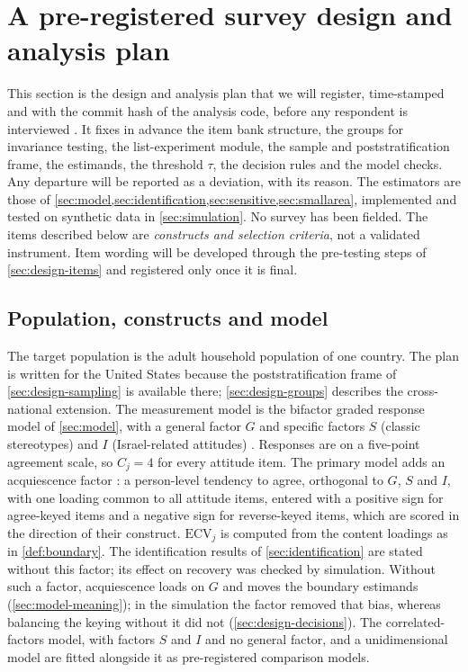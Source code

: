 \section{A pre-registered survey design and analysis plan}\label{sec:design}

This section is the design and analysis plan that we will register, time-stamped and with the commit hash of the analysis code, before any respondent is interviewed \citep{nosek2018}. It fixes in advance the item bank structure, the groups for invariance testing, the list-experiment module, the sample and poststratification frame, the estimands, the threshold $\tau$, the decision rules and the model checks. Any departure will be reported as a deviation, with its reason. The estimators are those of \cref{sec:model,sec:identification,sec:sensitive,sec:smallarea}, implemented and tested on synthetic data in \cref{sec:simulation}. No survey has been fielded. The items described below are \emph{constructs and selection criteria}, not a validated instrument. Item wording will be developed through the pre-testing steps of \cref{sec:design-items} and registered only once it is final.

\subsection{Population, constructs and model}\label{sec:design-constructs}

The target population is the adult household population of one country. The plan is written for the United States because the poststratification frame of \cref{sec:design-sampling} is available there; \cref{sec:design-groups} describes the cross-national extension. The measurement model is the bifactor graded response model of \cref{sec:model}, with a general factor $G$ and specific factors $S$ (classic stereotypes) and $I$ (Israel-related attitudes) \citep{samejima1969,gibbons1992,reise2012}. Responses are on a five-point agreement scale, so $C_j=4$ for every attitude item. The primary model adds an acquiescence factor \citep{maydeuolivares2006}: a person-level tendency to agree, orthogonal to $G$, $S$ and $I$, with one loading common to all attitude items, entered with a positive sign for agree-keyed items and a negative sign for reverse-keyed items, which are scored in the direction of their construct. $\mathrm{ECV}_j$ is computed from the content loadings as in \cref{def:boundary}. The identification results of \cref{sec:identification} are stated without this factor; its effect on recovery was checked by simulation. Without such a factor, acquiescence loads on $G$ and moves the boundary estimands (\cref{sec:model-meaning}); in the simulation the factor removed that bias, whereas balancing the keying without it did not (\cref{sec:design-decisions}). The correlated-factors model, with factors $S$ and $I$ and no general factor, and a unidimensional model are fitted alongside it as pre-registered comparison models.


